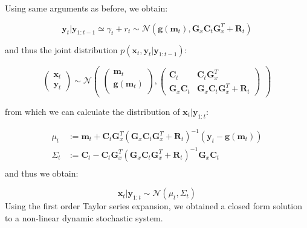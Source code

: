 \documentclass[
]{article}
\begin{document}
Using same arguments as before, we obtain:

\[
\begin{equation*}
    \textbf{y}_t| \textbf{y}_{1:t-1}\simeq \gamma_t + r_t \sim \mathcal{N}(\textbf{g}(\textbf{m}_{t}), \textbf{G}_x\textbf{C}_t\textbf{G}_x^T + \textbf{R}_t)
\end{equation*}
\]

and thus the joint distribution
\(p(\textbf{x}_t, \textbf{y}_t| \textbf{y}_{1:t-1})\):

\[
\begin{equation*}
    \begin{pmatrix}
        \textbf{x}_t \\
        \textbf{y}_t
    \end{pmatrix} \sim \mathcal{N} \begin{pmatrix}
        \begin{pmatrix}
            \textbf{m}_t\\
            \textbf{g}(\textbf{m}_{t})\\
        \end{pmatrix}, \begin{pmatrix}
            \textbf{C}_t & \textbf{C}_t \textbf{G}_x^T \\
            \textbf{G}_x\textbf{C}_t & \textbf{G}_x\textbf{C}_t\textbf{G}_x^T + \textbf{R}_t
        \end{pmatrix}
    \end{pmatrix}
\end{equation*}
\]

from which we can calculate the distribution of
\(\textbf{x}_t|\textbf{y}_{1:t}\):

\[
    \begin{equation*}
        \begin{aligned}
            \mu_t &:= \textbf{m}_t + \textbf{C}_t \textbf{G}_x^T(\textbf{G}_x\textbf{C}_t\textbf{G}_x^T + \textbf{R}_t)^{-1}(\textbf{y}_t - \textbf{g}(\textbf{m}_{t})) \\
            \Sigma_t &:=  \textbf{C}_t - \textbf{C}_t \textbf{G}_x^T(\textbf{G}_x\textbf{C}_t\textbf{G}_x^T + \textbf{R}_t)^{-1}\textbf{G}_x\textbf{C}_t\\
        \end{aligned}
    \end{equation*}
\] and thus we obtain:

\[
\begin{equation*}
    \textbf{x}_t|\textbf{y}_{1:t}\sim \mathcal{N}(\mu_t, \Sigma_t)
\end{equation*}
\] Using the first order Taylor series expansion, we obtained a closed
form solution to a non-linear dynamic stochastic system.
\end{document}
